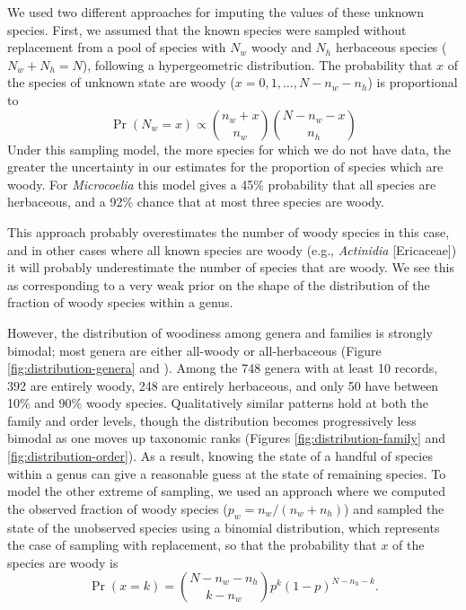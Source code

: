 \documentclass[a4paper,12pt]{article}
\begin{document}
We used two different approaches for imputing the values of these
unknown species. First, we assumed that the known species were sampled
without replacement from a pool of species with $N_w$ woody and $N_h$
herbaceous species ($N_w + N_h = N$), following a hypergeometric
distribution. The probability that $x$ of the species of unknown state
are woody ($x = 0, 1, \ldots, N - n_w - n_h$) is proportional to
\begin{equation}
  \Pr(N_w = x) \propto {n_w + x \choose n_w}
  {N - n_w - x \choose n_h}
\end{equation}
Under this sampling model, the more species for which we do not have data,
the greater the uncertainty in our estimates for the proportion of species
which are woody.
For \textit{Microcoelia} this model gives a 45\% probability that all
species are herbaceous, and a 92\% chance that at most three species
are woody.

This approach probably overestimates the number of woody species in
this case, and in other cases where all known species are woody (e.g.,
\textit{Actinidia} [Ericaceae]) it will probably underestimate the
number of species that are woody. We see this as corresponding to a
very weak prior on the shape of the distribution of the fraction of
woody species within a genus.

However, the distribution of woodiness among genera and families is
strongly bimodal; most genera are either all-woody or all-herbaceous
(Figure \ref{fig:distribution-genera} and 
\citealt{sinnott1915evolution}).  Among the 748 genera with at least 10
records, 392 are entirely woody, 248 are entirely herbaceous, and only
50 have between 10\% and 90\% woody species. Qualitatively similar patterns
hold at both the family and order levels, though the distribution
becomes progressively less bimodal as one moves up taxonomic ranks 
(Figures \ref{fig:distribution-family} and \ref{fig:distribution-order}). 
As a result, knowing the state of a handful of species within a genus 
can give a reasonable guess at the state of remaining species.
To model the other extreme of sampling, we used an approach where we
computed the observed fraction of woody species ($p_w = n_w / (n_w +
n_h)$) and sampled the state of the unobserved species using a
binomial distribution, which represents the case of sampling
with replacement, so that the probability that $x$ of the species
are woody is
\begin{equation}
  \Pr(x = k) = {N - n_w - n_h \choose k - n_w} 
  p^k (1-p)^{N - n_h - k}.
\end{equation}
\end{document}
